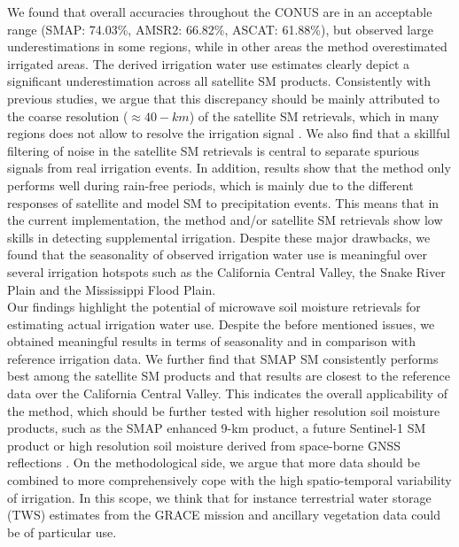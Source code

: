 \documentclass[hess, manuscript]{copernicus}
\begin{document}
We found that overall accuracies throughout the CONUS are in an acceptable range (SMAP: 74.03\%, AMSR2: 66.82\%, ASCAT: 61.88\%), but observed large underestimations in some regions, while in other areas the method overestimated irrigated areas. The derived irrigation water use estimates clearly depict a significant underestimation across all satellite SM products. Consistently with previous studies, we argue that this discrepancy should be mainly attributed to the coarse resolution ($\approx 40-km$) of the satellite SM retrievals, which in many regions does not allow to resolve the irrigation signal \citep{escorihuela2016comparison}. We also find that a skillful filtering of noise in the satellite SM retrievals is central to separate spurious signals from real irrigation events. In addition, results show that the method only performs well during rain-free periods, which is mainly due to the different responses of satellite and model SM to precipitation events. This means that in the current implementation, the method and/or satellite SM retrievals show low skills in detecting supplemental irrigation. Despite these major drawbacks, we found that the seasonality of observed irrigation water use is meaningful over several irrigation hotspots such as the California Central Valley, the Snake River Plain and the Mississippi Flood Plain.\\

Our findings highlight the potential of microwave soil moisture retrievals for estimating actual irrigation water use. Despite the before mentioned issues, we obtained meaningful results in terms of seasonality and in comparison with reference irrigation data. We further find that SMAP SM consistently performs best among the satellite SM products and that results are closest to the reference data over the California Central Valley. This indicates the overall applicability of the method, which should be further tested with higher resolution soil moisture products, such as the SMAP enhanced 9-km product, a future Sentinel-1 SM product or high resolution soil moisture derived from space-borne GNSS reflections \citep{chew2018soil}. On the methodological side, we argue that more data should be combined to more comprehensively cope with the high spatio-temporal variability of irrigation. In this scope, we think that for instance terrestrial water storage (TWS) estimates from the GRACE mission and ancillary vegetation data could be of particular use. 
\end{document}
